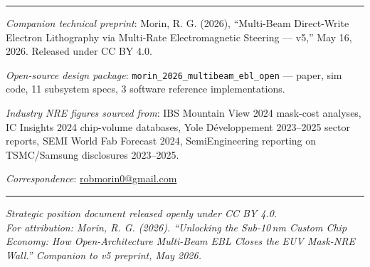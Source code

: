\documentclass[11pt,letterpaper]{article}
\begin{document}
\bigskip\hrule\bigskip

\noindent\textit{Companion technical preprint}: Morin, R. G. (2026), ``Multi-Beam Direct-Write Electron Lithography via Multi-Rate Electromagnetic Steering --- v5,'' May 16, 2026. Released under CC BY 4.0.

\medskip
\noindent\textit{Open-source design package}: \texttt{morin\_2026\_multibeam\_ebl\_open} --- paper, sim code, 11 subsystem specs, 3 software reference implementations.

\medskip
\noindent\textit{Industry NRE figures sourced from}: IBS Mountain View 2024 mask-cost analyses, IC Insights 2024 chip-volume databases, Yole D\'eveloppement 2023--2025 sector reports, SEMI World Fab Forecast 2024, SemiEngineering reporting on TSMC/Samsung disclosures 2023--2025.

\medskip
\noindent\textit{Correspondence}: \href{mailto:robmorin0@gmail.com}{robmorin0@gmail.com}

\vspace{1em}\hrule\vspace{0.5em}
\begin{center}
\textit{Strategic position document released openly under CC BY 4.0.}\\
\textit{For attribution: Morin, R. G. (2026). ``Unlocking the Sub-10\,nm Custom Chip Economy: How Open-Architecture Multi-Beam EBL Closes the EUV Mask-NRE Wall.'' Companion to v5 preprint, May 2026.}
\end{center}
\end{document}
